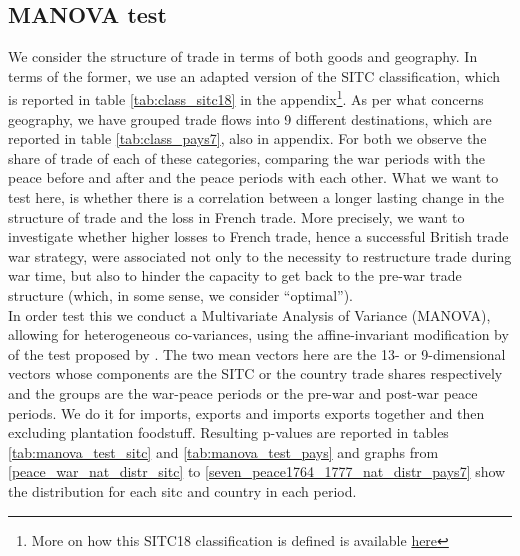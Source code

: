 \documentclass[12pt,a4paper,notitlepage,english]{article}
\begin{document}
\subsection{MANOVA test}
We consider the structure of trade in terms of both goods and geography. 
In terms of the former, we use an adapted version of the SITC classification, which is reported in table \ref{tab:class_sitc18} in the appendix\footnote{More on how this SITC18 classification is defined is available \href{http://toflit18.medialab.sciences-po.fr/\#/home}{here}}. As per what concerns geography, we have grouped trade flows into 9 different destinations, which are reported in table \ref{tab:class_pays7}, also in appendix. For both we observe the share of trade of each of these categories, comparing the war periods with the peace before and after and the peace periods with each other. 
What we want to test here, is whether there is a correlation between a longer lasting change in the structure of trade and the loss in French trade. More precisely, we want to investigate whether higher losses to French trade, hence a successful British trade war strategy, were associated not only to the necessity to restructure trade during war time, but also to hinder the capacity to get back to the pre-war trade structure (which, in some sense, we consider ``optimal''). \\
In order test this we conduct a Multivariate Analysis of Variance (MANOVA), allowing for heterogeneous co-variances, using the affine-invariant modification by \cite{Krishnamoorthy2004} of the test proposed by \cite{Nel1986}. The two mean vectors here are the 13- or 9-dimensional vectors whose components are the SITC or the country trade shares respectively and the groups are the war-peace periods or the pre-war and post-war peace periods. 
We do it for imports, exports and imports exports together and then excluding plantation foodstuff. Resulting p-values are reported in tables \ref{tab:manova_test_sitc} and \ref{tab:manova_test_pays} and graphs from \ref{peace_war_nat_distr_sitc} to \ref{seven_peace1764_1777_nat_distr_pays7} show the distribution for each sitc and country in each period. \\
\end{document}
